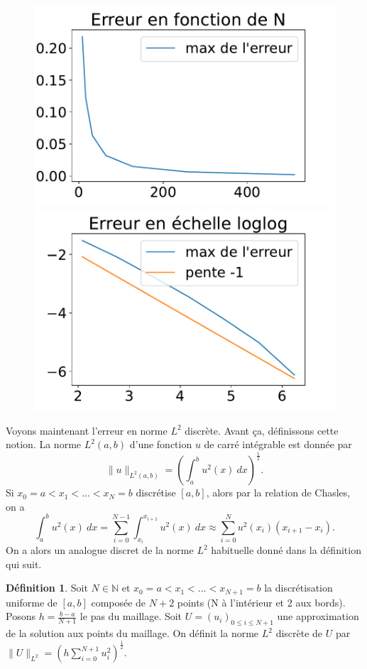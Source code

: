 \documentclass[
11pt, %
francais, %
singlespacing, %
headsepline, %
f%
]{MastersDoctoralThesis} %
\theoremstyle{definition}
\newtheorem{definition}{Définition}
\begin{document}
\begin{figure}
\includegraphics[scale = .6]{erreur}
\includegraphics[scale = .6]{erreurloglog} 
\end{figure}

Voyons maintenant l'erreur en norme $L^{2}$ discrète. Avant \c ca, définissons cette notion. La norme $L^{2}(a,b)$ d'une fonction $u$ de carré intégrable est donnée par $$\| u \|_{L^{2}(a,b)}=(\int_{a}^{b}u^{2}(x)~dx)^{\frac{1}{2}}.$$
Si $x_{0}=a<x_{1}<...<x_{N}=b$ discrétise $[a,b]$, alors par la relation de Chasles, on a $$\int_{a}^{b}u^{2}(x)~dx=\sum_{i=0}^{N-1}\int_{x_{i}}^{x_{i+1}}u^{2}(x)~dx\approx\sum_{i=0}^{N}u^{2}(x_{i})(x_{i+1}-x_{i}).$$
On a alors un analogue discret de la norme $L^{2}$ habituelle donné dans la définition qui suit.

\medskip

\begin{definition} Soit $N\in\mathbb{N}$ et $x_{0}=a<x_{1}<...<x_{N+1}=b$ la discrétisation uniforme de $[a,b]$ composée de $N+2$ points (N à l'intérieur et 2 aux bords). Posons $h=\frac{b-a}{N+1}$ le pas du maillage.
Soit $U=(u_{i})_{0\leq i \leq N+1}$ une approximation de la solution aux points du maillage. On définit la norme $L^{2}$ discrète de $U$ par $\| U \|_{L^{2}}=(h\sum_{i=0}^{N+1}u_{i}^{2})^{\frac{1}{2}}.$
\end{definition}
\end{document}
